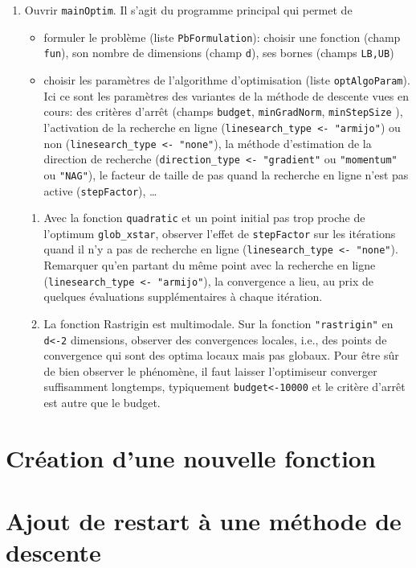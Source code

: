 \documentclass[12pt]{article}
\begin{document}
\begin{enumerate}
\item Ouvrir \texttt{mainOptim}. Il s'agit du programme principal qui permet de 
\begin{itemize}
\item formuler le problème (liste \texttt{PbFormulation}): choisir une fonction (champ \texttt{fun}), son nombre de dimensions (champ \texttt{d}), ses bornes (champs \texttt{LB,UB})
\item choisir les paramètres de l'algorithme d'optimisation (liste \texttt{optAlgoParam}).
Ici ce sont les paramètres des variantes de la méthode de descente vues en cours: des critères d'arrêt (champs \texttt{budget}, \texttt{minGradNorm}, \texttt{minStepSize} ), l'activation de la recherche en ligne (\texttt{linesearch\_type <- "armijo"}) ou non (\texttt{linesearch\_type <- "none"}), la méthode d'estimation de la direction de recherche (\texttt{direction\_type <- "gradient"} ou \texttt{"momentum"} ou \texttt{"NAG"}), le facteur de taille de pas quand la recherche en ligne n'est pas active (\texttt{stepFactor}), \ldots
\end{itemize}
\begin{enumerate}
\item Avec la fonction \texttt{quadratic} et un point initial pas trop proche de l'optimum \texttt{glob\_xstar}, observer l'effet de \texttt{stepFactor} sur les itérations quand il n'y a pas de recherche en ligne (\texttt{linesearch\_type <- "none"}). Remarquer qu'en partant du même point avec la recherche en ligne (\texttt{linesearch\_type <- "armijo"}), la convergence a lieu, au prix de quelques évaluations supplémentaires à chaque itération.
\item  La fonction Rastrigin est multimodale. Sur la fonction \texttt{"rastrigin"} en \texttt{d<-2} dimensions, observer des convergences locales, i.e., des points de convergence qui sont des optima locaux mais pas globaux. Pour être sûr de bien observer le phénomène, il faut laisser l'optimiseur converger suffisamment longtemps, typiquement \texttt{budget<-10000} et le critère d'arrêt est autre que le budget.
\end{enumerate}



\end{enumerate}
\section{Création d'une nouvelle fonction}
\section{Ajout de restart à une méthode de descente}
\end{document}
